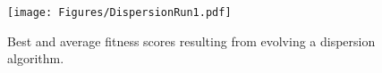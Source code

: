 \begin{figure}[ht]
	\centering
	\texttt{[image: Figures/DispersionRun1.pdf]}
\caption{Best and average fitness scores resulting from evolving a dispersion algorithm.}
\label{fig:DispersionResults-1}
\end{figure} 


\clearpage
